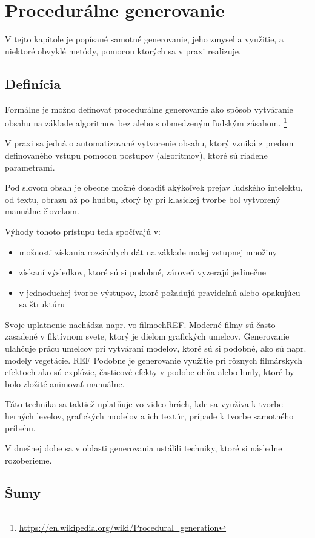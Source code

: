 \chapter{Procedurálne generovanie}

V tejto kapitole je popísané samotné generovanie, jeho zmysel a využitie, a niektoré obvyklé metódy, pomocou ktorých sa v praxi realizuje.
\section{Definícia}
Formálne je možno definovať procedurálne generovanie ako spôsob vytváranie obsahu na základe algoritmov  bez alebo s obmedzeným ľudským zásahom.
\footnote{\url{https://en.wikipedia.org/wiki/Procedural_generation}} 

V praxi sa jedná o automatizované vytvorenie obsahu, ktorý vzniká z predom definovaného vstupu pomocou postupov (algoritmov), ktoré sú riadene parametrami.

Pod slovom obsah je obecne možné dosadiť akýkoľvek prejav ľudského intelektu, od textu, obrazu až po hudbu, ktorý by pri klasickej tvorbe bol vytvorený manuálne človekom.

Výhody tohoto prístupu teda spočívajú v:
\begin{itemize}
\item možnosti získania rozsiahlych dát na základe malej vstupnej množiny
\item získaní výsledkov, ktoré sú si podobné, zároveň vyzerajú jedinečne
\item v jednoduchej tvorbe výstupov, ktoré požadujú pravideľnú alebo opakujúcu sa štruktúru
\end{itemize}

Svoje uplatnenie nachádza napr. vo filmoch{REF}. Moderné filmy sú často zasadené v fiktívnom svete, ktorý je dielom grafických umelcov. Generovanie uľahčuje prácu umelcov pri vytváraní modelov, ktoré sú si podobné, ako sú napr. modely vegetácie. {REF} Podobne je generovanie využitie pri rôznych filmárskych efektoch ako sú explózie, časticové efekty v podobe ohňa alebo hmly, ktoré by bolo zložité animovať manuálne.

Táto technika sa taktiež uplatňuje vo video hrách, kde sa využíva k tvorbe herných levelov, grafických modelov a ich textúr, prípade k tvorbe samotného príbehu.

V dnešnej dobe sa v oblasti generovania ustálili techniky, ktoré si následne rozoberieme.

\section{Šumy}


